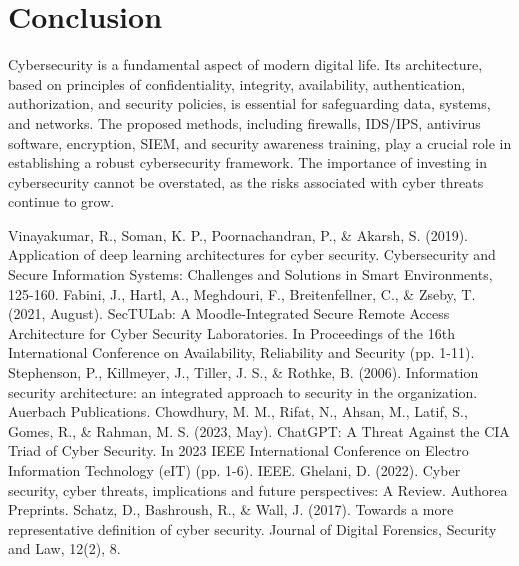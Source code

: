 \documentclass[12pt]{report}
\begin{document}
\newpage
\section*{Conclusion}
Cybersecurity is a fundamental aspect of modern digital life. Its architecture, based on principles of confidentiality, integrity, availability, authentication, authorization, and security policies, is essential for safeguarding data, systems, and networks. The proposed methods, including firewalls, IDS/IPS, antivirus software, encryption, SIEM, and security awareness training, play a crucial role in establishing a robust cybersecurity framework. The importance of investing in cybersecurity cannot be overstated, as the risks associated with cyber threats continue to grow.


\newpage
\renewcommand{\bibname}{References}
\begin{thebibliography}{}
    Vinayakumar, R., Soman, K. P., Poornachandran, P., \& Akarsh, S. (2019). Application of deep learning architectures for cyber security. Cybersecurity and Secure Information Systems: Challenges and Solutions in Smart Environments, 125-160.
    Fabini, J., Hartl, A., Meghdouri, F., Breitenfellner, C., \& Zseby, T. (2021, August). SecTULab: A Moodle-Integrated Secure Remote Access Architecture for Cyber Security Laboratories. In Proceedings of the 16th International Conference on Availability, Reliability and Security (pp. 1-11).
    Stephenson, P., Killmeyer, J., Tiller, J. S., \& Rothke, B. (2006). Information security architecture: an integrated approach to security in the organization. Auerbach Publications.
    Chowdhury, M. M., Rifat, N., Ahsan, M., Latif, S., Gomes, R., \& Rahman, M. S. (2023, May). ChatGPT: A Threat Against the CIA Triad of Cyber Security. In 2023 IEEE International Conference on Electro Information Technology (eIT) (pp. 1-6). IEEE.
    Ghelani, D. (2022). Cyber security, cyber threats, implications and future perspectives: A Review. Authorea Preprints.
    Schatz, D., Bashroush, R., \& Wall, J. (2017). Towards a more representative definition of cyber security. Journal of Digital Forensics, Security and Law, 12(2), 8.
\end{thebibliography}
\end{document}
